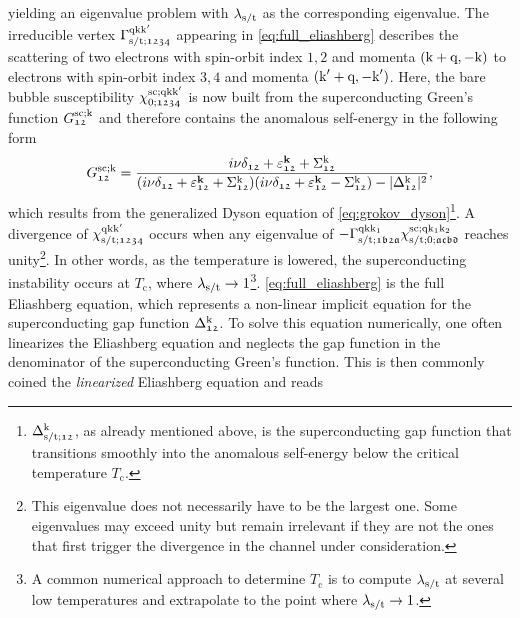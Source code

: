 \documentclass[../../main.tex]{subfiles}
\begin{document}
yielding an eigenvalue problem with $\lambda_{\text{s}/\text{t}}$ as the corresponding eigenvalue. The irreducible vertex $\Gamma^{\text{q}\text{k}\text{k}'}_{\text{s}/\text{t};\mathfrak{1234}}$ appearing in \eqref{eq:full_eliashberg} describes the scattering of two electrons with spin-orbit index $\mathfrak{1},\mathfrak{2}$ and momenta $(\text{k}+\text{q},-\text{k})$ to electrons with spin-orbit index $\mathfrak{3},\mathfrak{4}$ and momenta $(\text{k}'+\text{q},-\text{k}')$. Here, the bare bubble susceptibility $\chi^{\text{sc};\text{q}\text{k}\text{k}'}_{0;\mathfrak{1234}}$ is now built from the superconducting Green's function $G^{\text{sc};\text{k}}_{\mathfrak{12}}$ and therefore contains the anomalous self-energy in the following form
\begin{align}
	G^{\text{sc};\text{k}}_{\mathfrak{12}}=\frac{i\nu\delta_{\mathfrak{12}}+\varepsilon^{\textbf{k}}_{\mathfrak{12}}+\Sigma^{\text{k}}_{\mathfrak{12}}}{(i\nu\delta_{\mathfrak{12}}+\varepsilon^{\textbf{k}}_{\mathfrak{12}}+\Sigma^{\text{k}}_{\mathfrak{12}})(i\nu\delta_{\mathfrak{12}}+\varepsilon^{\textbf{k}}_{\mathfrak{12}}-\Sigma^{\text{k}}_{\mathfrak{12}})-|\Delta_{\mathfrak{12}}^{\text{k}}|^2},
\end{align}
which results from the generalized Dyson equation of \eqref{eq:grokov_dyson}\footnote{$\Delta_{\text{s}/\text{t};\mathfrak{12}}^{\text{k}}$, as already mentioned above, is the superconducting gap function that transitions smoothly into the anomalous self-energy below the critical temperature $T_\text{c}$.}. A divergence of $\chi^{\text{q}\text{k}\text{k}'}_{\text{s}/\text{t};\mathfrak{1234}}$ occurs when any eigenvalue of $-\Gamma^{\text{q}\text{k}\text{k}_1}_{\text{s}/\text{t};\mathfrak{1b2a}}\chi^{\text{sc};\text{q}\text{k}_1\text{k}_2}_{\text{s}/\text{t};0;\mathfrak{acbd}}$ reaches unity\footnote{This eigenvalue does not necessarily have to be the largest one. Some eigenvalues may exceed unity but remain irrelevant if they are not the ones that first trigger the divergence in the channel under consideration.}. In other words, as the temperature is lowered, the superconducting instability occurs at $T_\text{c}$, where $\lambda_{\text{s}/\text{t}}\to 1$\footnote{A common numerical approach to determine $T_\text{c}$ is to compute $\lambda_{\text{s}/\text{t}}$ at several low temperatures and extrapolate to the point where $\lambda_{\text{s}/\text{t}}\to1$.}. \eqref{eq:full_eliashberg} is the full Eliashberg equation, which represents a non-linear implicit equation for the superconducting gap function $\Delta_{\mathfrak{12}}^{\text{k}}$. To solve this equation numerically, one often linearizes the Eliashberg equation and neglects the gap function in the denominator of the superconducting Green's function. This is then commonly coined the \textit{linearized} Eliashberg equation and reads
\end{document}
